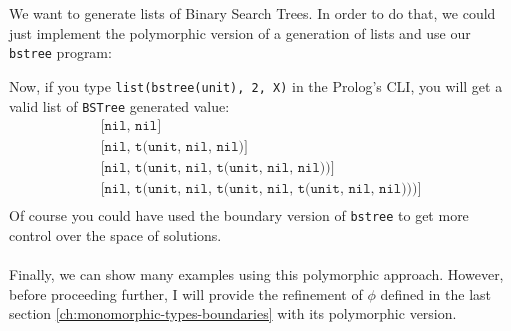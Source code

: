 \documentclass{report}
\theoremstyle{definition}
\theoremstyle{definition}
\newcommand{\ttt}[1]{\texttt{#1}}
\begin{document}
	
	We want to generate lists of Binary Search Trees. In order to do that, we could just implement the polymorphic version of a generation of lists and use our \ttt{bstree} program:
	
	Now, if you type \ttt{list(bstree(unit), 2, X)} in the Prolog's CLI, you will get a valid list of \ttt{BSTree} generated value:
	\begin{align*}
		  & \ttt{[nil, nil]}                                           &   \\
		  & \ttt{[nil, t(unit, nil, nil)]}                             &   \\
		  & \ttt{[nil, t(unit, nil, t(unit, nil, nil))]}               &   \\
		  & \ttt{[nil, t(unit, nil, t(unit, nil, t(unit, nil, nil)))]} &   \\
	\end{align*}
	Of course you could have used the boundary version of \ttt{bstree} to get more control over the space of solutions.\\\\
	Finally, we can show many examples using this polymorphic approach. However, before proceeding further, I will provide the refinement of $\phi$ defined in the last section \ref{ch:monomorphic-types-boundaries} with its polymorphic version.
\end{document}

